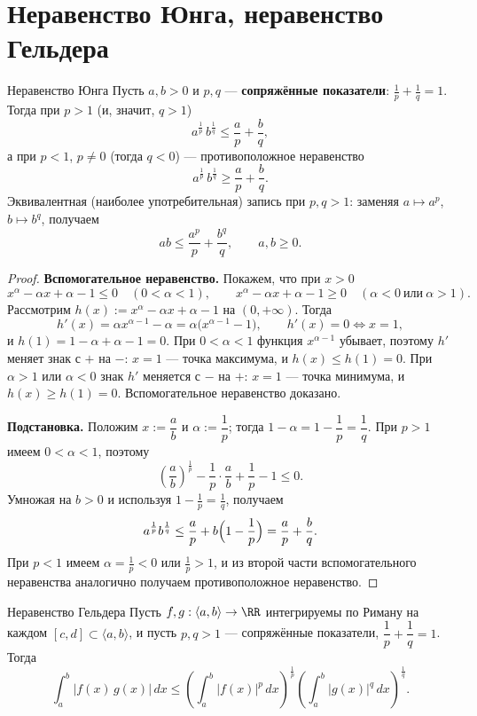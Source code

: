
\section{Неравенство Юнга, неравенство Гельдера}

\begin{Statement}{Неравенство Юнга}{}
	Пусть $a,b>0$ и $p,q$ --- \textbf{сопряжённые показатели}: $\frac{1}{p}+\frac{1}{q}=1.$
	Тогда при $p>1$ (и, значит, $q>1$)
	\[
	a^{\frac1p}\,b^{\frac1q}\le \frac{a}{p}+\frac{b}{q},
	\]
	а при $p<1$, $p\ne0$ (тогда $q<0$) --- противоположное неравенство
	\[
	a^{\frac1p}\,b^{\frac1q}\ge \frac{a}{p}+\frac{b}{q}.
	\]
	Эквивалентная (наиболее употребительная) запись при $p,q>1$: заменяя $a\mapsto a^p$,
	$b\mapsto b^q$, получаем
	\[
	ab\le \frac{a^p}{p}+\frac{b^q}{q},\qquad a,b\ge0.
	\]
\end{Statement}

\begin{proof}
	\textbf{Вспомогательное неравенство.} Покажем, что при $x>0$
	\[
	x^{\alpha}-\alpha x+\alpha-1\le0\quad(0<\alpha<1),
	\qquad
	x^{\alpha}-\alpha x+\alpha-1\ge0\quad(\alpha<0\ \text{или}\ \alpha>1).
	\]
	Рассмотрим $h(x):=x^{\alpha}-\alpha x+\alpha-1$ на $(0,+\infty)$. Тогда
	\[
	h'(x)=\alpha x^{\alpha-1}-\alpha=\alpha\bigl(x^{\alpha-1}-1\bigr),
	\qquad h'(x)=0\iff x=1,
	\]
	и $h(1)=1-\alpha+\alpha-1=0$. При $0<\alpha<1$ функция $x^{\alpha-1}$ убывает,
	поэтому $h'$ меняет знак с $+$ на $-$: $x=1$ --- точка максимума, и
	$h(x)\le h(1)=0$. При $\alpha>1$ или $\alpha<0$ знак $h'$ меняется с $-$ на
	$+$: $x=1$ --- точка минимума, и $h(x)\ge h(1)=0$. Вспомогательное
	неравенство доказано.

	\textbf{Подстановка.} Положим $x:=\dfrac{a}{b}$ и $\alpha:=\dfrac1p$; тогда
	$1-\alpha=1-\dfrac1p=\dfrac1q$. При $p>1$ имеем $0<\alpha<1$, поэтому
	\[
	\left(\frac{a}{b}\right)^{\frac1p}-\frac1p\cdot\frac{a}{b}+\frac1p-1\le0.
	\]
	Умножая на $b>0$ и используя $1-\frac1p=\frac1q$, получаем
	\[
	a^{\frac1p}b^{\frac1q}\le \frac{a}{p}+b\Bigl(1-\frac1p\Bigr)=\frac{a}{p}+\frac{b}{q}.
	\]
	При $p<1$ имеем $\alpha=\frac1p<0$ или $\frac1p>1$, и из второй части
	вспомогательного неравенства аналогично получаем противоположное неравенство.
\end{proof}

\begin{Theorem}[required]{Неравенство Гельдера}{}
	Пусть $f,g:\langle a,b\rangle\to\RR$ интегрируемы по Риману на каждом
	$[c,d]\subset\langle a,b\rangle$, и пусть $p,q>1$ --- сопряжённые показатели,
	$\dfrac1p+\dfrac1q=1$. Тогда
	\[
	\int_a^b |f(x)\,g(x)|\,dx
	\le
	\left(\int_a^b |f(x)|^{p}\,dx\right)^{\!\frac1p}
	\left(\int_a^b |g(x)|^{q}\,dx\right)^{\!\frac1q}.
	\]
\end{Theorem}

